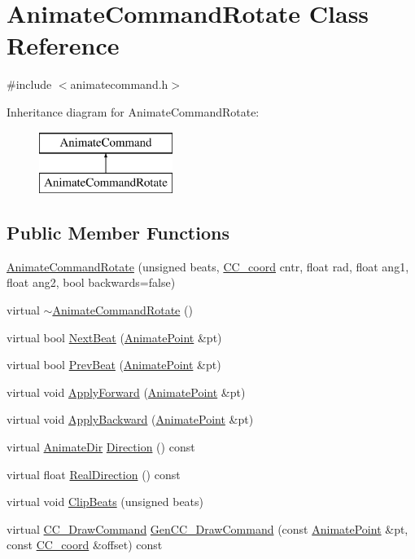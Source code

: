 \hypertarget{a00006}{\section{Animate\-Command\-Rotate Class Reference}
\label{a00006}
}


{\ttfamily \#include $<$animatecommand.\-h$>$}

Inheritance diagram for Animate\-Command\-Rotate\-:\begin{figure}[H]
\begin{center}
\leavevmode
\includegraphics[height=2.000000cm]{a00006}
\end{center}
\end{figure}
\subsection*{Public Member Functions}
\begin{DoxyCompactItemize}
\item 
\hyperlink{a00006_abe77dd3438d47f7b7683bad57fc7f387}{Animate\-Command\-Rotate} (unsigned beats, \hyperlink{a00029}{C\-C\-\_\-coord} cntr, float rad, float ang1, float ang2, bool backwards=false)
\item 
virtual \hyperlink{a00006_a64bcc3164c4df08efe08c67d1498c3dd}{$\sim$\-Animate\-Command\-Rotate} ()
\item 
virtual bool \hyperlink{a00006_a5d1ee680f19374391a6fbccdcd6b6bb7}{Next\-Beat} (\hyperlink{a00196_a91212e6bb797b2b440819b6a9a86f702}{Animate\-Point} \&pt)
\item 
virtual bool \hyperlink{a00006_a179b843d1c400020f0fbb106a09c38e5}{Prev\-Beat} (\hyperlink{a00196_a91212e6bb797b2b440819b6a9a86f702}{Animate\-Point} \&pt)
\item 
virtual void \hyperlink{a00006_a0ef1ae2cc3ca46a734b231bb38347f79}{Apply\-Forward} (\hyperlink{a00196_a91212e6bb797b2b440819b6a9a86f702}{Animate\-Point} \&pt)
\item 
virtual void \hyperlink{a00006_af8f47135c6190dc9363a4d7705ad443a}{Apply\-Backward} (\hyperlink{a00196_a91212e6bb797b2b440819b6a9a86f702}{Animate\-Point} \&pt)
\item 
virtual \hyperlink{a00196_a6feaf30c8830fe6fcc0982cb7e9621ab}{Animate\-Dir} \hyperlink{a00006_ad534024d6bd630dfc0cde5e07649094a}{Direction} () const 
\item 
virtual float \hyperlink{a00006_afd366a7d56e16f296a80faab4ffe4972}{Real\-Direction} () const 
\item 
virtual void \hyperlink{a00006_a865113f57c577626241256ab35981834}{Clip\-Beats} (unsigned beats)
\item 
virtual \hyperlink{a00031}{C\-C\-\_\-\-Draw\-Command} \hyperlink{a00006_a999e00a33481237a53af76481913d83f}{Gen\-C\-C\-\_\-\-Draw\-Command} (const \hyperlink{a00196_a91212e6bb797b2b440819b6a9a86f702}{Animate\-Point} \&pt, const \hyperlink{a00029}{C\-C\-\_\-coord} \&offset) const 
\end{DoxyCompactItemize}
